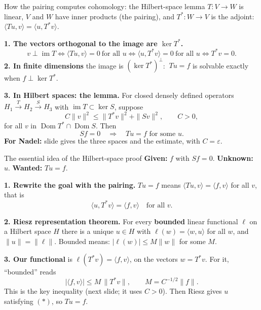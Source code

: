 \begin{frame}{How the pairing computes cohomology: the Hilbert-space lemma}
\label{fr:linalg-adjoint}
\label{fr:hilbert-lemma}
\(T:V\to W\) is linear, \(V\) and \(W\) have inner products (the pairing), and \(T^*:W\to V\) is the adjoint: \(\langle Tu,v\rangle=\langle u,T^*v\rangle\).
\par\medskip
\textbf{1. The vectors orthogonal to the image are \(\ker T^*\).}
\[
v\perp\operatorname{im}T\iff\langle Tu,v\rangle=0\ \text{for all }u\iff\langle u,T^*v\rangle=0\ \text{for all }u\iff T^*v=0 .
\]
\textbf{2. In finite dimensions} the image is \((\ker T^*)^\perp\): \(\ Tu=f\) is solvable exactly when \(f\perp\ker T^*\).
\par\medskip
\textbf{3. In Hilbert spaces: the lemma.} For closed densely defined operators \(H_1\xrightarrow{T}H_2\xrightarrow{S}H_3\) with \(\operatorname{im}T\subset\ker S\), suppose
\[
C\|v\|^2\le\|T^*v\|^2+\|Sv\|^2,\qquad C>0,
\]
for all \(v\) in \(\operatorname{Dom}T^*\cap\operatorname{Dom}S\). Then
\[
\boxed{Sf=0\quad\Longrightarrow\quad Tu=f\text{ for some }u.}
\]
\textbf{For Nadel:} slide \hyperlink{fr:nadel-estimate}{\pageref{fr:nadel-estimate}} gives the three spaces and the estimate, with \(C=\varepsilon\).
\end{frame}


\begin{frame}{The essential idea of the Hilbert-space proof}
\label{fr:hilbert-idea}
\textbf{Given:} \(f\) with \(Sf=0\). \textbf{Unknown:} \(u\). \textbf{Wanted:} \(Tu=f\).
\par\medskip
\textbf{1. Rewrite the goal with the pairing.} \(Tu=f\) means \(\langle Tu,v\rangle=\langle f,v\rangle\) for all \(v\), that is
\[
\langle u,T^*v\rangle=\langle f,v\rangle\quad\text{for all } v .\tag{$*$}
\]

\textbf{2. Riesz representation theorem.} For every \textbf{bounded} linear functional \(\ell\) on a Hilbert space \(H\) there is a unique \(u\in H\) with \(\ell(w)=\langle w,u\rangle\) for all \(w\), and \(\|u\|=\|\ell\|\). Bounded means: \(|\ell(w)|\le M\|w\|\) for some \(M\).
\par\medskip
\textbf{3. Our functional} is \(\ell(T^*v)=\langle f,v\rangle\), on the vectors \(w=T^*v\). For it, ``bounded'' reads
\[
\boxed{|\langle f,v\rangle|\le M\,\|T^*v\| ,\qquad M=C^{-1/2}\|f\| .}
\]
This is the key inequality (next slide; it uses \(C>0\)). Then Riesz gives \(u\) satisfying \((*)\), so \(Tu=f\).
\end{frame}


